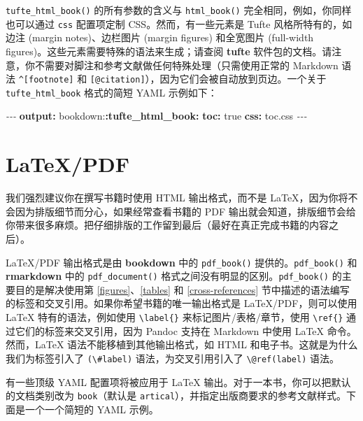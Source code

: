 \documentclass[
  12pt,
]{krantz}
\newenvironment{Shaded}{\begin{snugshade}}{\end{snugshade}}
\newcommand{\AttributeTok}[1]{\textcolor[rgb]{0.13,0.29,0.53}{#1}}
\newcommand{\CharTok}[1]{\textcolor[rgb]{0.31,0.60,0.02}{#1}}
\newcommand{\FunctionTok}[1]{\textcolor[rgb]{0.13,0.29,0.53}{\textbf{#1}}}
\newcommand{\KeywordTok}[1]{\textcolor[rgb]{0.13,0.29,0.53}{\textbf{#1}}}
\newcommand{\PreprocessorTok}[1]{\textcolor[rgb]{0.56,0.35,0.01}{\textit{#1}}}
\theoremstyle{definition}
\theoremstyle{definition}
\theoremstyle{definition}
\theoremstyle{definition}
\theoremstyle{remark}
\begin{document}
\texttt{tufte\_html\_book()} 的所有参数的含义与 \texttt{html\_book()} 完全相同，例如，你同样也可以通过 \texttt{css} 配置项定制 CSS。然而，有一些元素是 Tufte 风格所特有的，如边注 (margin notes)、边栏图片 (margin figures) 和全宽图片 (full-width figures)。这些元素需要特殊的语法来生成；请查阅 \textbf{tufte} 软件包的文档。请注意，你不需要对脚注和参考文献做任何特殊处理（只需使用正常的 Markdown 语法 \texttt{\^{}{[}footnote{]}} 和 \texttt{{[}@citation{]}}），因为它们会被自动放到页边。一个关于 \texttt{tufte\_html\_book} 格式的简短 YAML 示例如下：

\begin{Shaded}
\begin{Highlighting}[]
\PreprocessorTok{{-}{-}{-}}
\FunctionTok{output}\KeywordTok{:}
\AttributeTok{  bookdown:}\FunctionTok{:tufte\_html\_book}\KeywordTok{:}
\AttributeTok{    }\FunctionTok{toc}\KeywordTok{:}\AttributeTok{ }\CharTok{true}
\AttributeTok{    }\FunctionTok{css}\KeywordTok{:}\AttributeTok{ toc.css}
\PreprocessorTok{{-}{-}{-}}
\end{Highlighting}
\end{Shaded}

\section{LaTeX/PDF}\label{latexpdf}

我们强烈建议你在撰写书籍时使用 HTML 输出格式，而不是 LaTeX，因为你将不会因为排版细节而分心，如果经常查看书籍的 PDF 输出就会知道，排版细节会给你带来很多麻烦。把仔细排版的工作留到最后（最好在真正完成书籍的内容之后）。

LaTeX/PDF 输出格式是由 \textbf{bookdown} 中的 \texttt{pdf\_book()} 提供的。\texttt{pdf\_book()} 和 \textbf{rmarkdown} 中的 \texttt{pdf\_document()} 格式之间没有明显的区别。\texttt{pdf\_book()} 的主要目的是解决使用第 \ref{figures}、\ref{tables} 和 \ref{cross-references} 节中描述的语法编写的标签和交叉引用。如果你希望书籍的唯一输出格式是 LaTeX/PDF，则可以使用 LaTeX 特有的语法，例如使用 \texttt{\textbackslash{}label\{\}} 来标记图片/表格/章节，使用 \texttt{\textbackslash{}ref\{\}} 通过它们的标签来交叉引用，因为 Pandoc 支持在 Markdown 中使用 LaTeX 命令。然而，LaTeX 语法不能移植到其他输出格式，如 HTML 和电子书。这就是为什么我们为标签引入了 \texttt{(\textbackslash{}\#label)} 语法，为交叉引用引入了 \texttt{\textbackslash{}@ref(label)} 语法。

有一些顶级 YAML 配置项将被应用于 LaTeX 输出。对于一本书，你可以把默认的文档类别改为 \texttt{book}（默认是 \texttt{artical}），并指定出版商要求的参考文献样式。下面是一个一个简短的 YAML 示例。
\end{document}
